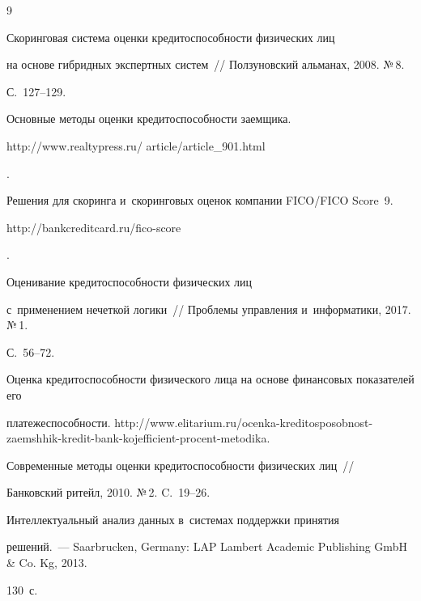 {\small\frenchspacing

{%


\begin{thebibliography}{9}




 Скоринговая система оценки кредитоспособности физических лиц 

на основе гибридных экспертных систем~/\!\!/ Ползуновский альманах, 2008. №\,8.  

С.~127--129. 


Основные методы оценки кредитоспособности заемщика. {\sf 

http://www.realtypress.ru/ article/article\_901.html}.


Решения для скоринга и~скоринговых оценок компании FICO/FICO Score~9. {\sf 

http://bankcreditcard.ru/fico-score}.


 Оценивание кредитоспособности физических лиц 

с~применением нечеткой логики~/\!\!/ Проблемы управления и~информатики, 2017. №\,1. 

С.~56--72. 


Оценка кредитоспособности физического лица на основе финансовых показателей его 

платежеспособности. {\sf http://www.elitarium.ru/ocenka-kreditosposobnost-zaemshhik-kredit-bank-kojefficient-procent-metodika}.


 Современные методы оценки кредитоспособности физических лиц~/\!\!/ 

Банковский ритейл, 2010. №\,2. C.~19--26. 


 Интеллектуальный анализ данных в~системах поддержки принятия 

решений.~--- Saarbrucken, Germany: LAP Lambert Academic Publishing GmbH \& Co. Kg, 2013. 

130~с.

        \end{thebibliography}

} }





